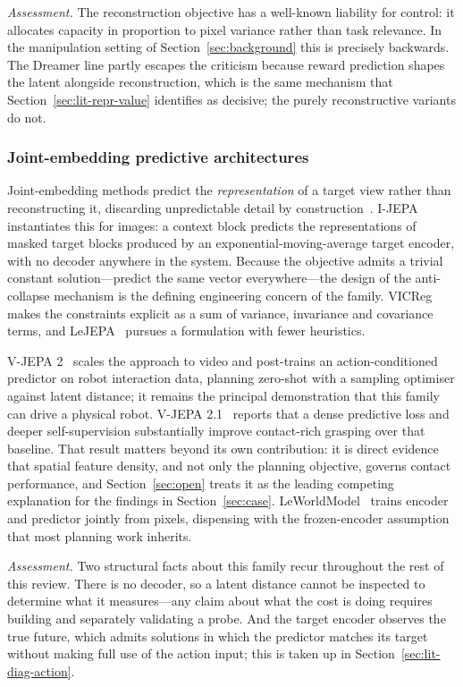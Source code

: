 \documentclass[11pt,letterpaper]{article}
\begin{document}
\emph{Assessment.} The reconstruction objective has a well-known liability for
control: it allocates capacity in proportion to pixel variance rather than task
relevance. In the manipulation setting of Section~\ref{sec:background} this is
precisely backwards. The Dreamer line partly escapes the criticism because
reward prediction shapes the latent alongside reconstruction, which is the same
mechanism that Section~\ref{sec:lit-repr-value} identifies as decisive; the
purely reconstructive variants do not.

\subsubsection{Joint-embedding predictive architectures}

Joint-embedding methods predict the \emph{representation} of a target view
rather than reconstructing it, discarding unpredictable detail by
construction~\citep{lecun2022path}. I-JEPA~\citep{assran2023ijepa} instantiates
this for images: a context block predicts the representations of masked target
blocks produced by an exponential-moving-average target encoder, with no
decoder anywhere in the system. Because the objective admits a trivial constant
solution---predict the same vector everywhere---the design of the anti-collapse
mechanism is the defining engineering concern of the family.
VICReg~\citep{bardes2022vicreg} makes the constraints explicit as a sum of
variance, invariance and covariance terms, and LeJEPA~\citep{lejepa2025} pursues
a formulation with fewer heuristics.

V-JEPA 2~\citep{assran2025vjepa2} scales the approach to video and post-trains an
action-conditioned predictor on robot interaction data, planning zero-shot with a
sampling optimiser against latent distance; it remains the principal
demonstration that this family can drive a physical robot. V-JEPA
2.1~\citep{murlabadia2026vjepa21} reports that a dense predictive loss and deeper
self-supervision substantially improve contact-rich grasping over that baseline.
That result matters beyond its own contribution: it is direct evidence that
spatial feature density, and not only the planning objective, governs contact
performance, and Section~\ref{sec:open} treats it as the leading competing
explanation for the findings in Section~\ref{sec:case}.
LeWorldModel~\citep{maes2026leworldmodel} trains encoder and predictor jointly
from pixels, dispensing with the frozen-encoder assumption that most planning
work inherits.

\emph{Assessment.} Two structural facts about this family recur throughout the
rest of this review. There is no decoder, so a latent distance cannot be
inspected to determine what it measures---any claim about what the cost is doing
requires building and separately validating a probe. And the target encoder
observes the true future, which admits solutions in which the predictor matches
its target without making full use of the action input; this is taken up in
Section~\ref{sec:lit-diag-action}.
\end{document}
